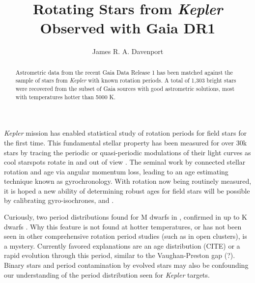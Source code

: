 \documentclass[manuscript, letterpaper]{aastex6}
\makeatletter
\let\origsection\section
\renewcommand\section{\@ifstar{\starsection}{\nostarsection}}
\newcommand\nostarsection[1]{\sectionprelude\origsection{#1}}
\newcommand\starsection[1]{\sectionprelude\origsection*{#1}}
\newcommand\sectionprelude{\vspace{1em}}
\newcommand{\Kepler}{\textsl{Kepler}\xspace}
\makeatother
\begin{document}
\title{Rotating Stars from \Kepler Observed with Gaia DR1}


\author{
	James R. A. Davenport
	}

 

 

\begin{abstract}
Astrometric data from the recent Gaia Data Release 1 has been matched against the sample of stars from \Kepler with known rotation periods. A total of 1,303 bright stars were recovered from the subset of Gaia sources with good astrometric solutions, most with temperatures hotter than 5000 K. 

\end{abstract}



\section{Introduction}

\Kepler mission \citep{borucki2010} has enabled statistical study of rotation periods for field stars for the first time. This fundamental stellar property has been measured for over 30k stars by tracing the periodic or quasi-periodic modulations of their light curves as cool starspots rotate in and out of view \citep{reinhold2013,mcquillan2014}. The seminal work by \citet{skumanich1972} connected stellar rotation and age via angular momentum loss, leading to an age estimating technique known as gyrochronology.
With rotation now being routinely measured, it is hoped a new ability of determining robust ages for field stars will be possible by calibrating gyro-isochrones, and  \citep[e.g.][]{angus2015,van-saders2016}. 


Curiously, two period distributions found for M dwarfs in \citet{mcquillan2013}, confirmed in up to K dwarfs \citet{mcquillan2014}. Why this feature is not found at hotter temperatures, or has not been seen in other comprehensive rotation period studies (such as in open clusters), is a mystery. Currently favored explanations are an age distribution (CITE) or a rapid evolution through this period, similar to the Vaughan-Preston gap (?).  Binary stars and period contamination by evolved stars may also be confounding our understanding of the period distribution seen for \Kepler targets.
\end{document}
